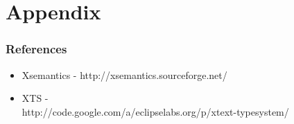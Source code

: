 \section[Appendix]{Appendix}


\begin{frame}
  \frametitle{References}
  \begin{itemize}
    \item Xsemantics - http://xsemantics.sourceforge.net/
    \item XTS -
    \\ http://code.google.com/a/\-eclipselabs.org\-/p/\-xtext-typesystem/
  \end{itemize}
\end{frame}